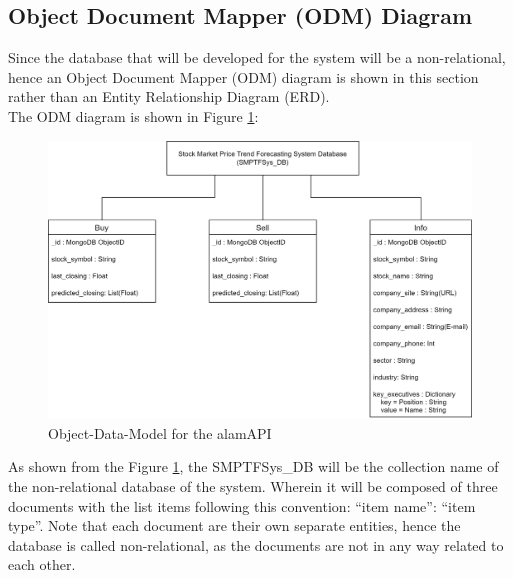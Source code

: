 \subsection{Object Document Mapper (ODM) Diagram}
\label{subsec:odm_subsec}
Since the database that will be developed for the system will be 
a non-relational, hence an Object Document Mapper (ODM) 
diagram is shown in this section rather than an Entity Relationship Diagram (ERD).
\hfill \\

The ODM diagram is shown in Figure \ref{fig:odm}:
\begin{figure}[ht]
    \centering
    \includegraphics[width=1\textwidth]{./assets/ODM.png}
    \caption{Object-Data-Model for the alamAPI}
    \label{fig:odm}
\end{figure}
\FloatBarrier
As shown from the Figure \ref{fig:odm}, the SMPTFSys\_DB will be the collection
name of the non-relational database of the system. Wherein it 
will be composed of three documents with the list items following this convention: 
“item name”: “item type”. 
Note that each document are their own separate entities, 
hence the database is called non-relational, as the documents are not in 
any way related to each other.
\hfill \\

